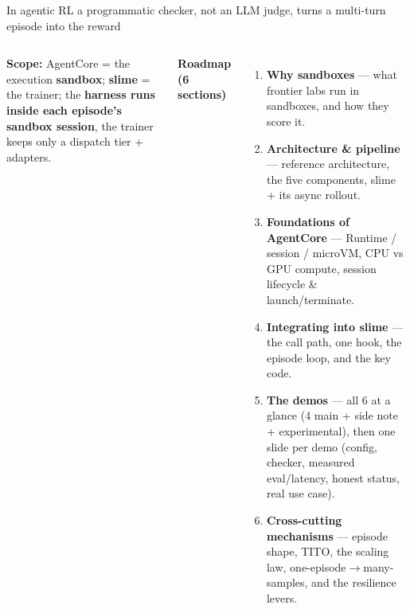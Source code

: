 \begin{frame}{In agentic RL a programmatic checker, not an LLM judge, turns a multi-turn episode into the reward}
\begin{columns}[T]
\vspace{2mm}
{\footnotesize\textbf{Scope:} AgentCore = the execution \textbf{sandbox}; \textbf{slime} = the trainer; the \textbf{harness runs inside each episode's sandbox session}, the trainer keeps only a dispatch tier + adapters.\par}
{\footnotesize\textbf{Roadmap (6 sections)}\par}
\begin{enumerate}\footnotesize\setlength{\itemsep}{0.6mm}
\item \textbf{Why sandboxes} --- what frontier labs run in sandboxes, and how they score it.
\item \textbf{Architecture \& pipeline} --- reference architecture, the five components, slime + its async rollout.
\item \textbf{Foundations of AgentCore} --- Runtime / session / microVM, CPU vs GPU compute, session lifecycle \& launch/terminate.
\item \textbf{Integrating into slime} --- the call path, one hook, the episode loop, and the key code.
\item \textbf{The demos} --- all 6 at a glance (4 main + side note + experimental), then one slide per demo (config, checker, measured eval/latency, honest status, real use case).
\item \textbf{Cross-cutting mechanisms} --- episode shape, TITO, the scaling  law, one-episode$\rightarrow$many-samples, and the resilience levers.
\end{enumerate}
\end{columns}
\end{frame}

